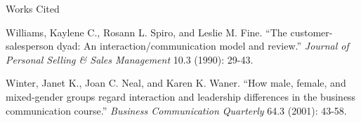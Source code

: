 \documentclass[12pt]{article}
\newcommand{\bibent}{\noindent \hangindent 40pt}
\newenvironment{workscited}{\newpage \begin{center} Works Cited \end{center}}{\newpage }
\begin{document}
\begin{flushleft}
\newpage
\begin{workscited}

  
\bibent
Williams, Kaylene C., Rosann L. Spiro, and Leslie M. Fine. ``The customer-salesperson dyad: An interaction/communication model and review.'' \textit{Journal of Personal Selling \& Sales Management} 10.3 (1990): 29-43.

\bibent
Winter, Janet K., Joan C. Neal, and Karen K. Waner. ``How male, female, and mixed-gender groups regard interaction and leadership differences in the business communication course.''  \textit{Business Communication Quarterly} 64.3 (2001): 43-58.



\end{workscited}

\end{flushleft}
\end{document}
